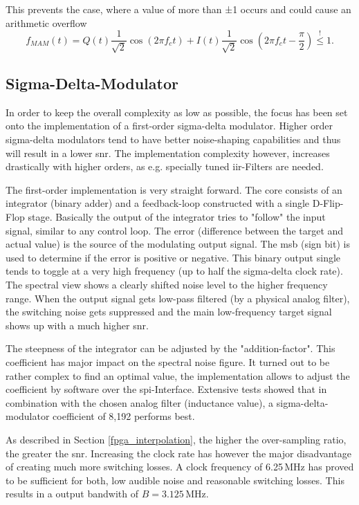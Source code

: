 This prevents the case, where a value of more than ±1 occurs and could cause an arithmetic overflow
\begin{equation}
    f_{MAM}(t) = Q(t)\frac{1}{\sqrt{2}}\cos(2\pi f_c t) + I(t)\frac{1}{\sqrt{2}}\cos(2\pi f_c t - \frac{\pi}{2})  \overset{!}{\leq} 1.
\end{equation}

\subsection{Sigma-Delta-Modulator}
In order to keep the overall complexity as low as possible, the focus has been set onto the implementation of a first-order sigma-delta modulator. Higher order sigma-delta modulators tend to have better noise-shaping capabilities and thus will result in a lower \acrshort{snr}. The implementation complexity however, increases drastically with higher orders, as e.g. specially tuned \acrshort{iir}-Filters are needed.

The first-order implementation is very straight forward. The core consists of an integrator (binary adder) and a feedback-loop constructed with a single D-Flip-Flop stage. Basically the output of the integrator tries to "follow" the input signal, similar to any control loop. The error (difference between the target and actual value) is the source of the modulating output signal. The \acrshort{msb} (sign bit) is used to determine if the error is positive or negative. This binary output single tends to toggle at a very high frequency (up to half the sigma-delta clock rate). The spectral view shows a clearly shifted noise level to the higher frequency range. When the output signal gets low-pass filtered (by a physical analog filter), the switching noise gets suppressed and the main low-frequency target signal shows up with a much higher \acrshort{snr}.

The steepness of the integrator can be adjusted by the "addition-factor". This coefficient has major impact on the spectral noise figure. It turned out to be rather complex to find an optimal value, the implementation allows to adjust the coefficient by software over the \acrshort{spi}-Interface. Extensive tests showed that in combination with the chosen analog filter (inductance value), a sigma-delta-modulator coefficient of 8,192 performs best.

As described in Section \ref{fpga_interpolation}, the higher the over-sampling ratio, the greater the \acrshort{snr}. Increasing the clock rate has however the major disadvantage of creating much more switching losses. A clock frequency of 6.25\,MHz has proved to be sufficient for both, low audible noise and reasonable switching losses. This results in a output bandwith of $B=3.125$\,MHz.

